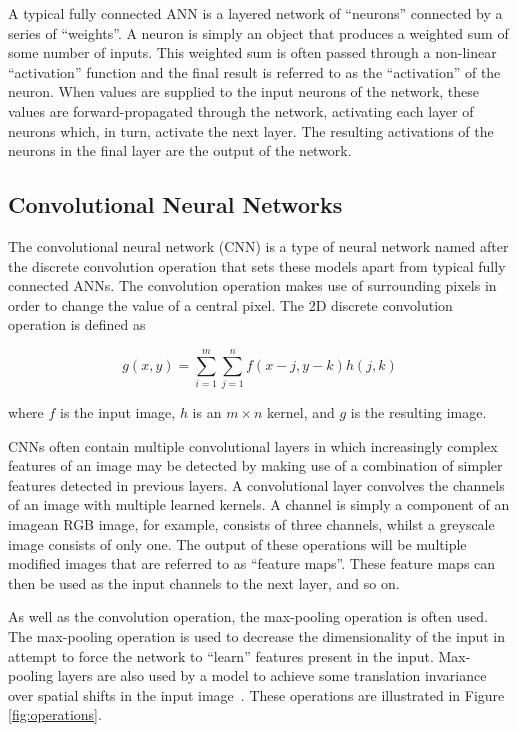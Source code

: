 A typical fully connected ANN is a layered network of ``neurons'' connected by a series of ``weights''. A neuron is simply an object that produces a weighted sum of some number of inputs. This weighted sum is often passed through a non-linear ``activation'' function and the final result is referred to as the ``activation'' of the neuron. When values are supplied to the input neurons of the network, these values are forward-propagated through the network, activating each layer of neurons which, in turn, activate the next layer. The resulting activations of the neurons in the final layer are the output of the network.

\subsection{Convolutional Neural Networks}

The convolutional neural network (CNN) is a type of neural network named after the discrete convolution operation that sets these models apart from typical fully connected ANNs. The convolution operation makes use of surrounding pixels in order to change the value of a central pixel. The 2D discrete convolution operation is defined as

\begin{equation}
    g(x,y)=\sum_{i=1}^{m}\sum_{j=1}^{n}f(x-j,y-k)h(j,k)
\end{equation}

\noindent
where $f$ is the input image, $h$ is an $m\times n$ kernel, and $g$ is the resulting image.

CNNs often contain multiple convolutional layers in which increasingly complex features of an image may be detected by making use of a combination of simpler features detected in previous layers. A convolutional layer convolves the channels of an image with multiple learned kernels. A channel is simply a component of an image\textemdash an RGB image, for example, consists of three channels, whilst a greyscale image consists of only one. The output of these operations will be multiple modified images that are referred to as ``feature maps''. These feature maps can then be used as the input channels to the next layer, and so on.

As well as the convolution operation, the max-pooling operation is often used. The max-pooling operation is used to decrease the dimensionality of the input in attempt to force the network to ``learn'' features present in the input. Max-pooling layers are also used by a model to achieve some translation invariance over spatial shifts in the input image~\cite{segnet}. These operations are illustrated in Figure \ref{fig:operations}.

